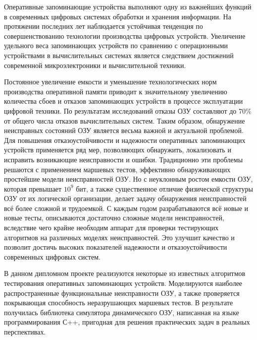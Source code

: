 \label{sec:intro}

Оперативные запоминающие устройства выполняют одну из важнейших функций в современных цифровых системах обработки и хранения информации. На протяжении последних лет наблюдается устойчивая тенденция по совершенствованию технологии производства цифровых устройств. Увеличение удельного веса запоминающих устройств по сравнению с операционными устройствами в вычислительных системах является следствием достижений современной микроэлектроники и вычислительной техники. 

Постоянное увеличение емкости и уменьшение технологических норм производства оперативной памяти приводит к значительному увеличению количества сбоев и отказов запоминающих устройств в процессе эксплуатации цифровой техники. По результатам исследований отказы ОЗУ составляют до 70\% от общего числа отказов вычислительных систем. Таким образом, обнаружение неисправных состояний ОЗУ является весьма важной и актуальной проблемой. Для повышения отказоустойчивости и надежности оперативных запоминающих устройств применяется ряд мер, позволяющих обнаружить, локализовать и исправить возникающие неисправности и ошибки. Традиционно эти проблемы решаются с применением маршевых тестов, эффективно обнаруживающих простейшие модели неисправностей ОЗУ. Но с неуклонным ростом емкости ОЗУ, которая превышает $10^9$ бит, а также существенное отличие физической структуры ОЗУ от их логической организации, делает задачу обнаружения неисправностей всё более сложной и трудоемкой. С каждым годом разрабатываются всё новые и новые тесты, описываются достаточно сложные модели неисправностей, вследствие чего крайне необходим аппарат для проверки тестирующих алгоритмов на различных  моделях неисправностей. Это улучшит качество и позволит достичь высоких показателей надежности и отказоустойчивости современных цифровых систем.

В данном дипломном проекте реализуются некоторые из известных алгоритмов тестирования оперативных запоминающих устройств. Моделируются наиболее распространенные функциональные неисправности ОЗУ, а также проверяется покрывающая способность неразрушающих маршевых тестов.
В результате получилась библиотека симулятора динамического ОЗУ, написанная на языке программирования С++, пригодная для решения практических задач в реальных перспективах.
